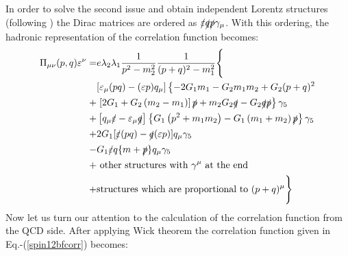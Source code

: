 %
In order to solve the second issue and obtain independent Lorentz structures (following \cite{AlievRadDec}) the Dirac matrices are ordered as $\slashed{\varepsilon}\slashed{q}\slashed{p}\gamma_\mu$. With this ordering, the hadronic representation of the correlation function becomes:
%
    \begin{align}
        \nonumber\Pi_{\mu\nu}(p,q)\varepsilon^\nu =& e \lambda_2 \lambda_1 \frac{1}{p^{2}-m_2^{2}} \frac{1}{(p+q)^{2}-m_1^{2}}\Bigg\{\\
        \nonumber&{\left[\varepsilon_{\mu}(p q)-(\varepsilon p) q_{\mu}\right]\left\{-2 G_{1} m_1-G_{2} m_1 m_2+G_{2}(p+q)^{2}\right.}\\
        \nonumber+&\left.\left[2 G_{1}+G_{2}\left(m_2-m_1\right)\right] \slashed{p}+m_2 G_{2} \slashed{q}-G_{2} \slashed{q} \slashed{p}\right\} \gamma_{5}\\
        +&\left[q_{\mu} \slashed{\varepsilon}-\varepsilon_{\mu} \slashed{q}\right]\left\{G_{1}\left(p^{2}+m_1 m_2\right)-G_{1}\left(m_1+m_2\right) \slashed{p}\right\} \gamma_{5}\\
        \nonumber+&2 G_{1}[\slashed{\varepsilon}(p q)-\slashed{q}(\varepsilon p)] q_{\mu} \gamma_{5}\\
        \nonumber-&G_{1} \slashed{\varepsilon} q\{m+\slashed{p}\} q_{\mu} \gamma_{5}\\
        \nonumber+&\text { other structures with } \gamma^{\mu} \text { at the end}\\
        \nonumber+&\text{structures which are proportional to }(p+q)^{\mu}\Bigg\}
    \end{align}
%
%
Now let us turn our attention to the calculation of the correlation function from the QCD side. After applying Wick theorem the correlation function given in Eq.-(\ref{spin12bfcorr}) becomes:
%

